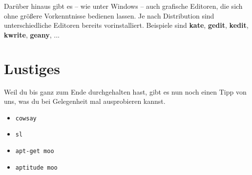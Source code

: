 \documentclass[a4paper,10pt]{article}
\begin{document}
Darüber hinaus gibt es -- wie unter Windows -- auch grafische Editoren, 
die sich ohne größere Vorkenntnisse bedienen lassen. Je nach Distribution
sind unterschiedliche Editoren bereits vorinstalliert. Beispiele sind
\textbf{kate}, \textbf{gedit}, \textbf{kedit}, \textbf{kwrite}, \textbf{geany}, ...

\pagebreak
\section{Lustiges}
Weil du bis ganz zum Ende durchgehalten hast, gibt es nun noch einen 
Tipp von uns, was du bei Gelegenheit mal ausprobieren kannst.
\begin{itemize} 
\item \texttt{cowsay}
\item \texttt{sl}
\item \texttt{apt-get moo}
\item \texttt{aptitude moo}
\end{itemize}

\bigskip
{}
\end{document}

